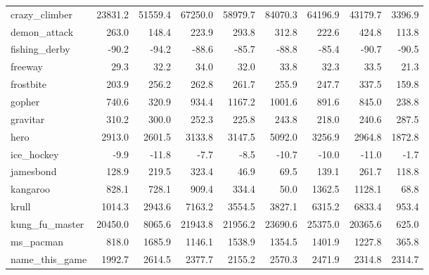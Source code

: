\documentclass{article} %
\begin{document}
\begin{tabular}{lrrrrrrrr}
crazy\_climber   &    23831.2 &         51559.4 &  67250.0 &      58979.7 &      84070.3 &       64196.9 &      43179.7 &     3396.9 \\
demon\_attack    &      263.0 &           148.4 &    223.9 &        293.8 &        312.8 &         222.6 &        424.8 &      113.8 \\
fishing\_derby   &      -90.2 &           -94.2 &    -88.6 &        -85.7 &        -88.8 &         -85.4 &        -90.7 &      -90.5 \\
freeway         &       29.3 &            32.2 &     34.0 &         32.0 &         33.8 &          32.3 &         33.5 &       21.3 \\
frostbite       &      203.9 &           256.2 &    262.8 &        261.7 &        255.9 &         247.7 &        337.5 &      159.8 \\
gopher          &      740.6 &           320.9 &    934.4 &       1167.2 &       1001.6 &         891.6 &        845.0 &      238.8 \\
gravitar        &      310.2 &           300.0 &    252.3 &        225.8 &        243.8 &         218.0 &        240.6 &      287.5 \\
hero            &     2913.0 &          2601.5 &   3133.8 &       3147.5 &       5092.0 &        3256.9 &       2964.8 &     1872.8 \\
ice\_hockey      &       -9.9 &           -11.8 &     -7.7 &         -8.5 &        -10.7 &         -10.0 &        -11.0 &       -1.7 \\
jamesbond       &      128.9 &           219.5 &    323.4 &         46.9 &         69.5 &         139.1 &        261.7 &      118.8 \\
kangaroo        &      828.1 &           728.1 &    909.4 &        334.4 &         50.0 &        1362.5 &       1128.1 &       68.8 \\
krull           &     1014.3 &          2943.6 &   7163.2 &       3554.5 &       3827.1 &        6315.2 &       6833.4 &      953.4 \\
kung\_fu\_master  &    20450.0 &          8065.6 &  21943.8 &      21956.2 &      23690.6 &       25375.0 &      20365.6 &      625.0 \\
ms\_pacman       &      818.0 &          1685.9 &   1146.1 &       1538.9 &       1354.5 &        1401.9 &       1227.8 &      365.8 \\
name\_this\_game  &     1992.7 &          2614.5 &   2377.7 &       2155.2 &       2570.3 &        2471.9 &       2314.8 &     2314.7 \\

\end{tabular}
\end{document}
